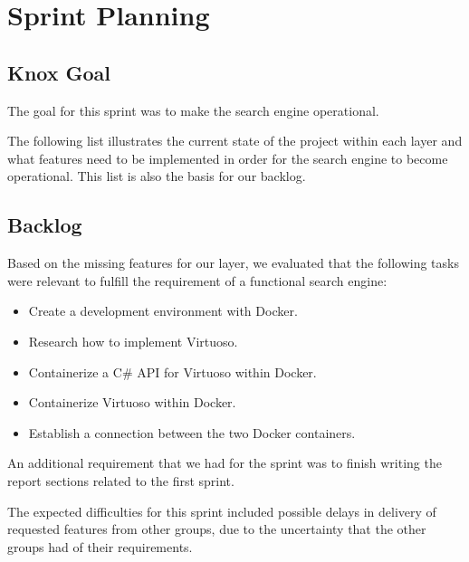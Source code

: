 
\section{Sprint Planning}
\subsection*{Knox Goal}
The goal for this sprint was to make the search engine operational.

The following list illustrates the current state of the \knox{} project within each layer and what features need to be implemented in order for the search engine to become operational. This list is also the basis for our backlog.



\subsection*{Backlog}
Based on the missing features for our layer, we evaluated that the following tasks were relevant to fulfill the requirement of a functional search engine:
\begin{itemize}
    \item Create a development environment with Docker.
    \item Research how to implement Virtuoso.
    \item Containerize a C\# API for Virtuoso within Docker.
    \item Containerize Virtuoso within Docker.
    \item Establish a connection between the two Docker containers.
\end{itemize}

An additional requirement that we had for the sprint was to finish writing the report sections related to the first \knox{} sprint.

The expected difficulties for this sprint included possible delays in delivery of requested features from other groups, due to the uncertainty that the other groups had of their requirements. 

